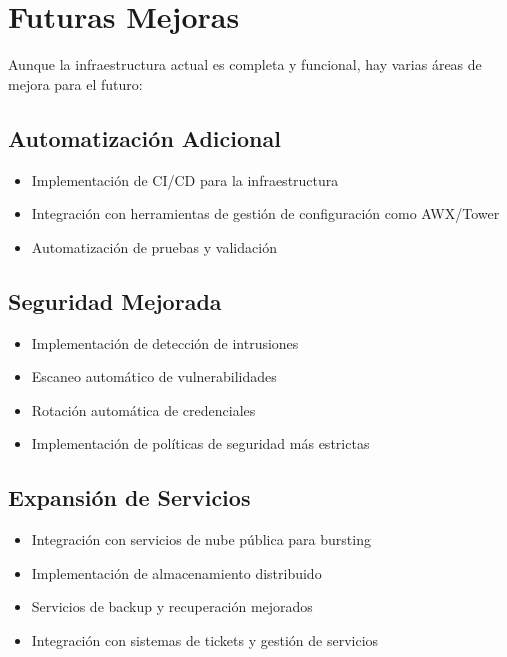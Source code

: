 \documentclass[12pt,a4paper]{article}
\begin{document}
\section{Futuras Mejoras}
\newpage

Aunque la infraestructura actual es completa y funcional, hay varias áreas de mejora para el futuro:

\subsection{Automatización Adicional}

\begin{itemize}[leftmargin=*]
    \item Implementación de CI/CD para la infraestructura
    \item Integración con herramientas de gestión de configuración como AWX/Tower
    \item Automatización de pruebas y validación
\end{itemize}

\subsection{Seguridad Mejorada}

\begin{itemize}[leftmargin=*]
    \item Implementación de detección de intrusiones
    \item Escaneo automático de vulnerabilidades
    \item Rotación automática de credenciales
    \item Implementación de políticas de seguridad más estrictas
\end{itemize}

\subsection{Expansión de Servicios}

\begin{itemize}[leftmargin=*]
    \item Integración con servicios de nube pública para bursting
    \item Implementación de almacenamiento distribuido
    \item Servicios de backup y recuperación mejorados
    \item Integración con sistemas de tickets y gestión de servicios
\end{itemize}
\end{document}
